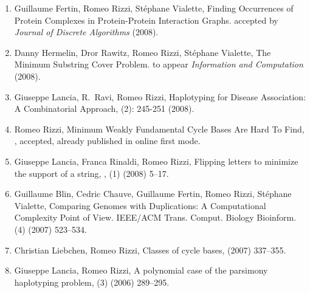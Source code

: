 \documentclass[10pt]{article}
\begin{document}
\begin{enumerate}
\vspace{-3.0mm}

 \vspace{1.2mm}
  \item {\sc Guillaume Fertin, Romeo Rizzi, St\'ephane Vialette},
   \newblock  Finding Occurrences of Protein
              Complexes in Protein-Protein Interaction Graphs.
   \newblock  accepted by {\it Journal of Discrete Algorithms} (2008).

  \item {\sc Danny Hermelin, Dror Rawitz, Romeo Rizzi, St\'ephane Vialette},
   \newblock  The Minimum Substring Cover Problem.
   \newblock  to appear {\it Information and Computation} (2008).

  \item {\sc Giuseppe Lancia, R.~Ravi, Romeo Rizzi},
   \newblock  Haplotyping for Disease Association: A Combinatorial Approach, 
   (2): 245-251 (2008).

  \item {\sc Romeo Rizzi},
   \newblock   Minimum Weakly Fundamental Cycle Bases Are Hard To Find,
   , accepted,
             already published in online first mode.

  \item {\sc Giuseppe Lancia, Franca Rinaldi, Romeo Rizzi},
   \newblock  Flipping letters to minimize the support of a string,
   ,
   (1) (2008) 5--17.

  \item {\sc Guillaume Blin, Cedric Chauve, Guillaume Fertin, Romeo Rizzi, St\'ephane Vialette},
   \newblock  Comparing Genomes with Duplications: A Computational Complexity Point of View.
   \newblock  IEEE/ACM Trans. Comput. Biology Bioinform.
   (4) (2007) 523--534.

  \item {\sc Christian Liebchen, Romeo Rizzi},
   \newblock  Classes of cycle bases,
    (2007) 337--355.

  \item {\sc Giuseppe Lancia, Romeo Rizzi},
   \newblock  A polynomial case of the parsimony haplotyping problem,
   (3) (2006) 289--295.


\end{enumerate}
\end{document}
